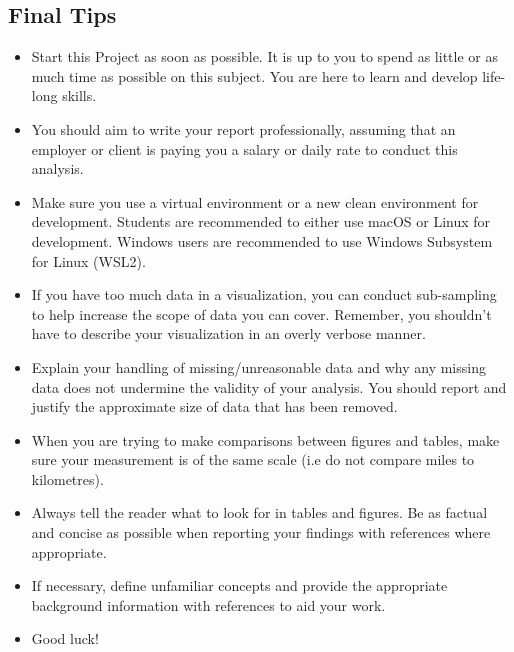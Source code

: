 \documentclass[12pt]{article}
\begin{document}
\subsection*{Final Tips}
\begin{itemize}
    \item Start this Project as soon as possible. It is up to you to spend as little or as much time as possible on this subject. You are here to learn and develop life-long skills.
    \item You should aim to write your report professionally, assuming that an employer or client is paying you a salary or daily rate to conduct this analysis. 
    \item Make sure you use a virtual environment or a new clean environment for development. Students are recommended to either use macOS or Linux for development. Windows users are recommended to use Windows Subsystem for Linux (WSL2).
    \item If you have too much data in a visualization, you can conduct sub-sampling to help increase the scope of data you can cover. Remember, you shouldn't have to describe your visualization in an overly verbose manner. 
    \item Explain your handling of missing/unreasonable data and why any missing data does not undermine the validity of your analysis. You should report and justify the approximate size of data that has been removed. 
    \item When you are trying to make comparisons between figures and tables, make sure your measurement is of the same scale (i.e do not compare miles to kilometres).
    \item Always tell the reader what to look for in tables and figures. Be as factual and concise as possible when reporting your findings with references where appropriate.
    \item If necessary, define unfamiliar concepts and provide the appropriate background information with references to aid your work. 
    \item Good luck!
\end{itemize}
\end{document}
